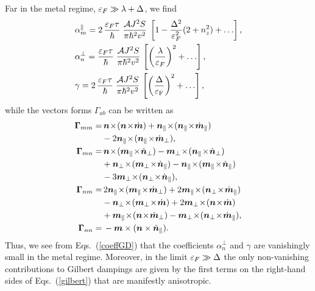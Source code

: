 Far in the metal regime, $\varepsilon_F\gg \lambda+\Delta$, we find
\beml
\label{coeffGD}
\begin{align}
&\alpha_m^\parallel= 2\,\frac{\ep_F\tau}{\hbar}\;\frac{\mathcal{A} J^2 S}{\pi\hbar^2v^2}\; \lt[1-\frac{\Delta^2}{\ep_F^2}(2+n^2_z) + \dots\rt],\\
&\alpha_n^\perp = \frac{\ep_F\tau}{\hbar}\;\frac{\mathcal{A} J^2 S}{\pi\hbar^2v^2} \,\lt[\lt(\frac{\lambda}{\ep_F}\rt)^2+\dots\rt],\\
&\gamma= 2\,\frac{\ep_F\tau}{\hbar}\;\frac{\mathcal{A} J^2 S}{\pi\hbar^2v^2}\,\lt[\lt(\frac{\Delta}{\ep_\textrm{F}}\rt)^2+\dots\rt],
\end{align}
\eml
while the vectors forms $\Gamma_{ab}$ can be written as
\beml
\begin{align}
\bb{\Gamma}_{mm}=&\,
\bb{n}\!\times\!(\bb{n}\!\times\!\dot{\bb{m}}) + \bb{n}_\parallel\!\times\!(\bb{n}_\parallel\!\times\!\dot{\bb{m}}_\parallel) \n\\ 
&- 2 \bb{n}_\parallel\!\times\!(\bb{n}_\parallel\!\times\!\dot{\bb{m}}_\perp),\\
\bb{\Gamma}_{mn}=&\,
\bb{n}\!\times\!(\bb{m}_\parallel\!\times\!\dot{\bb{n}}_\perp) 
- \bb{m}_\perp\!\times\!(\bb{n}_\parallel\!\times\!\dot{\bb{n}}_\perp)\n\\
&+\bb{n}_\perp\!\times\!(\bb{m}_\perp\!\times\!\dot{\bb{n}}_\parallel) 
- \bb{n}_\parallel\!\times\!(\bb{m}_\parallel\!\times\!\dot{\bb{n}}_\parallel)\n\\
&- 3\bb{m}_\perp\!\times\!(\bb{n}_\perp\!\times\!\dot{\bb{n}}_\parallel),\\
\bb{\Gamma}_{nm}=&\,2\bb{n}_\parallel\!\times\!(\bb{m}_\parallel\!\times\!\dot{\bb{m}}_\perp)+ 
2\bb{m}_\parallel\!\times\!(\bb{n}_\perp\!\times\!\dot{\bb{m}}_\parallel)\n\\
&-\bb{n}_\perp\!\times\!(\bb{m}_\perp\!\times\!\dot{\bb{m}})+2 \bb{m}_\perp\!\times\!(\bb{n}\!\times\!\dot{\bb{m}})\n\\
&+ \bb{m}_\parallel\!\times\!(\bb{n}\!\times\!\dot{\bb{m}}_\perp) 
- \bb{m}_\perp\!\times\!(\bb{n}_\perp\!\times\!\dot{\bb{m}}_\parallel),\\
\bb{\Gamma}_{nn}=&\,-\bb{m}\times(\bb{n}\times\dot{\bb{n}}_\parallel).
\end{align}
\eml
Thus, we see from Eqs.~(\ref{coeffGD}) that the coefficients $\alpha_n^{\perp}$ and $\gamma$ are vanishingly small in the metal regime. Moreover, in the limit $\varepsilon_F\gg \Delta$ the only non-vanishing contributions to Gilbert dampings are given by the first terms on the right-hand sides of Eqs.~(\ref{gilbert}) that are manifestly anisotropic.

